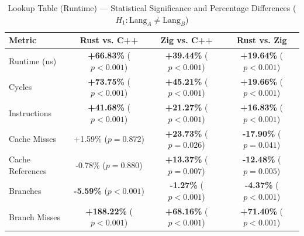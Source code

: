 \begin{table}[htbp]
\centering
\caption{Lookup Table (Runtime) --- Statistical Significance and Percentage Differences ($H_1: \text{Lang}_A \neq \text{Lang}_B$)}
\label{tab:lut_runtime}
\begin{tabular}{l ccc}
\toprule
\textbf{Metric} & \textbf{Rust vs. C++} & \textbf{Zig vs. C++} & \textbf{Rust vs. Zig} \\
\midrule
Runtime (ns) & \textbf{+66.83\%} ($p < 0.001$) & \textbf{+39.44\%} ($p < 0.001$) & \textbf{+19.64\%} ($p < 0.001$) \\
Cycles & \textbf{+73.75\%} ($p < 0.001$) & \textbf{+45.21\%} ($p < 0.001$) & \textbf{+19.66\%} ($p < 0.001$) \\
Instructions & \textbf{+41.68\%} ($p < 0.001$) & \textbf{+21.27\%} ($p < 0.001$) & \textbf{+16.83\%} ($p < 0.001$) \\
Cache Misses & +1.59\% ($p = 0.872$) & \textbf{+23.73\%} ($p = 0.026$) & \textbf{-17.90\%} ($p = 0.041$) \\
Cache References & -0.78\% ($p = 0.880$) & \textbf{+13.37\%} ($p = 0.007$) & \textbf{-12.48\%} ($p = 0.005$) \\
Branches & \textbf{-5.59\%} ($p < 0.001$) & \textbf{-1.27\%} ($p < 0.001$) & \textbf{-4.37\%} ($p < 0.001$) \\
Branch Misses & \textbf{+188.22\%} ($p < 0.001$) & \textbf{+68.16\%} ($p < 0.001$) & \textbf{+71.40\%} ($p < 0.001$) \\
\bottomrule
\end{tabular}
\end{table}


